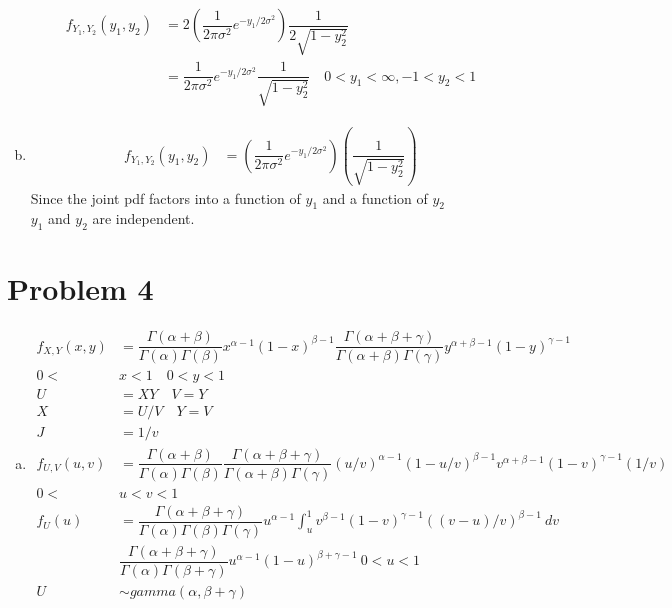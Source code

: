 \documentclass{article}
\begin{document}
\begin{flushleft}
\begin{enumerate}[(a)]
\begin{align*}
f_{Y_1,Y_2}(y_1,y_2)&=2\left(\dfrac{1}{2\pi\sigma^2}e^{-y_1/2\sigma^2}\right)\dfrac{1}{2\sqrt{1-y_2^2}}\\
&=\dfrac{1}{2\pi\sigma^2}e^{-y_1/2\sigma^2}\dfrac{1}{\sqrt{1-y_2^2}} \quad 0<y_1<\infty,-1<y_2<1
\end{align*}
\item 
\begin{align*}
f_{Y_1,Y_2}(y_1,y_2)&=\left(\dfrac{1}{2\pi\sigma^2}e^{-y_1/2\sigma^2}\right)\left(\dfrac{1}{\sqrt{1-y_2^2}}\right)
\end{align*}
Since the joint pdf factors into a function of $y_1$ and a function of $y_2$\\
$y_1$ and $y_2$ are independent.
\end{enumerate}
\pagebreak
\section*{Problem 4}
\begin{enumerate}[(a)]
\item 
\begin{align*}
f_{X,Y}(x,y)&=\dfrac{\Gamma(\alpha+\beta)}{\Gamma(\alpha)\Gamma(\beta)}x^{\alpha-1}(1-x)^{\beta-1}\dfrac{\Gamma(\alpha+\beta+\gamma)}{\Gamma(\alpha+\beta)\Gamma(\gamma)}y^{\alpha+\beta-1}(1-y)^{\gamma-1}\\
0<&x<1 \quad 0<y<1\\
U&=XY \quad V=Y\\
X&=U/V \quad Y=V\\
J&=1/v\\
f_{U,V}(u,v)&=\dfrac{\Gamma(\alpha+\beta)}{\Gamma(\alpha)\Gamma(\beta)}\dfrac{\Gamma(\alpha+\beta+\gamma)}{\Gamma(\alpha+\beta)\Gamma(\gamma)}(u/v)^{\alpha-1}(1-u/v)^{\beta-1}v^{\alpha+\beta-1}(1-v)^{\gamma-1}(1/v)\\
0<&u<v<1\\
f_U(u)&=\dfrac{\Gamma(\alpha+\beta+\gamma)}{\Gamma(\alpha)\Gamma(\beta)\Gamma(\gamma)}u^{\alpha-1}\int_{u}^{1}v^{\beta-1}(1-v)^{\gamma-1}((v-u)/v)^{\beta-1} \ dv\\
&\dfrac{\Gamma(\alpha+\beta+\gamma)}{\Gamma(\alpha)\Gamma(\beta+\gamma)}u^{\alpha-1}(1-u)^{\beta+\gamma-1} \ 0<u<1\\
U&\sim gamma(\alpha,\beta+\gamma)
\end{align*}
\end{enumerate}

\end{flushleft}
\end{document}
